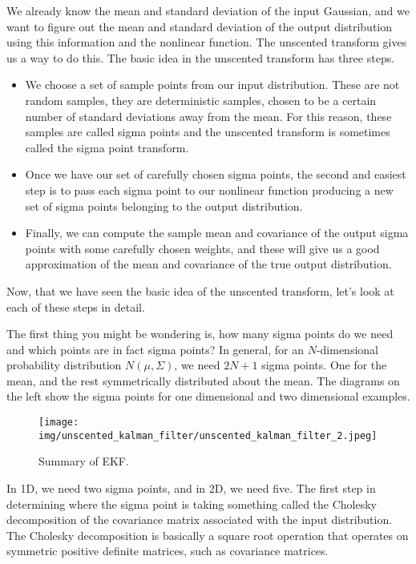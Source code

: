 We already know the mean and standard deviation of the input Gaussian, and we want to figure out the mean and
standard deviation of the output distribution using this information and
the nonlinear function. The unscented transform
gives us a way to do this. The basic idea in the unscented
transform has three steps. 

\begin{itemize}
\item We choose a set of sample points from our input distribution. These are not random samples,
they are deterministic samples, chosen to be a certain number of standard deviations away from the mean. For this reason,
these samples are called sigma points and the unscented transform is sometimes
called the sigma point transform. 
\item Once we have our set of carefully chosen sigma points, the second and easiest step is to pass each sigma point
to our nonlinear function producing a new set of sigma points belonging to the output distribution. 
\item Finally, we can compute the sample mean and covariance of the output sigma points with some carefully chosen weights, and
these will give us a good approximation of the mean and covariance of the true output distribution. 
\end{itemize}

Now, that we have seen the basic
idea of the unscented transform, let's look at each of these steps in detail. 

The first thing you might be wondering is, how many sigma points do we need and which points are in fact sigma points? In general, for
an $N$-dimensional probability distribution $N(\mu, \Sigma)$, we need $2N + 1$ sigma points. One for the mean, and the rest
symmetrically distributed about the mean. The diagrams on the left show the sigma
points for one dimensional and two dimensional examples. 

\begin{figure}[!htb]
\begin{center}
\texttt{[image: img/unscented\_kalman\_filter/unscented\_kalman\_filter\_2.jpeg]}
\end{center}
\caption{Summary of EKF.}
\label{unscented_kalman_filter_2}
\end{figure}

In 1D, we need two sigma points, and in 2D, we need five. The first step in determining where
the sigma point is taking something called the Cholesky decomposition
of the covariance matrix associated with the input distribution. The Cholesky decomposition is basically
a square root operation that operates on symmetric positive definite matrices,
such as covariance matrices. 


